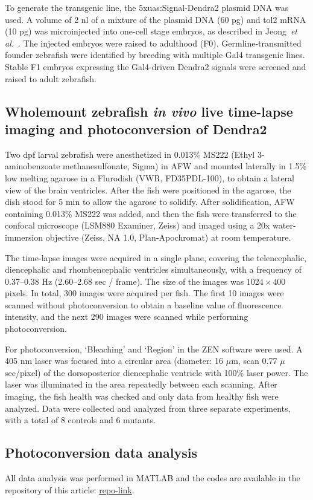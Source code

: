 \documentclass[fleqn]{wlscirep}
\begin{document}
To generate the transgenic line, the 5xuas:Signal-Dendra2 plasmid DNA was used.
A volume of 2 nl of a mixture of the plasmid DNA (60 pg) and tol2 mRNA (10 pg)
was microinjected into one-cell stage embryos,
as described in Jeong~\emph{et al.}~\cite{Jeong2024TheZebrafish}. The injected
embryos were raised to adulthood (F0).
Germline-transmitted founder zebrafish were identified by breeding with
multiple Gal4 transgenic lines. Stable F1 embryos expressing the Gal4-driven
Dendra2 signals were screened and raised to adult zebrafish.

\subsection*{Wholemount zebrafish \emph{in vivo} live time-lapse imaging and photoconversion of Dendra2}
Two dpf larval zebrafish were anesthetized in 0.013\% MS222
(Ethyl 3-aminobenzoate methanesulfonate, Sigma) in AFW and
mounted laterally in 1.5\% low melting agarose in a Flurodish (VWR, FD35PDL-100),
to obtain a lateral view of the brain ventricles. After the
fish were positioned in the agarose, the dish stood for 5 min to allow the agarose to solidify.
After solidification, AFW containing 0.013\% MS222 was added,
and then the fish were transferred to the confocal microscope (LSM880 Examiner, Zeiss)
and imaged using a 20x water-immersion objective (Zeiss, NA 1.0, Plan-Apochromat)
at room temperature.

The time-lapse images were acquired in a single plane, covering the
telencephalic, diencephalic and rhombencephalic ventricles simultaneously,
with a frequency of 0.37--0.38 Hz (2.60--2.68 sec / frame). The size
of the images was $1024\times400$ pixels. In total, 300 images were acquired per fish.
The first 10 images were scanned without photoconversion to obtain a
baseline value of fluorescence intensity, and the next 290 images were
scanned while performing photoconversion. 

For photoconversion, ‘Bleaching’ and ‘Region’ in the ZEN software
were used. A 405 nm laser was focused into a circular area (diameter: 16 $\mu$m, scan 0.77 $\mu$sec/pixel)
of the dorsoposterior diencephalic ventricle with 100\% laser power.
The laser was illuminated in the area repeatedly between each scanning.
After imaging, the fish health was checked and only data from healthy fish were analyzed.
Data were collected and analyzed from three separate experiments,
with a total of 8 controls and 6 mutants.

\subsection*{Photoconversion data analysis}
All data analysis was performed in MATLAB and the codes are available in
the repository of this article: \url{repo-link}.
\end{document}
